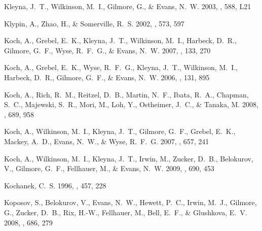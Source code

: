 \documentclass[manuscript]{aastex}
\begin{document}
\begin{thebibliography}{381}
{Kleyna}, J.~T., {Wilkinson}, M.~I., {Gilmore}, G., \& {Evans}, N.~W. 2003,
  \apjl, 588, L21

{Klypin}, A., {Zhao}, H., \& {Somerville}, R.~S. 2002, \apj, 573, 597

{Koch}, A., {Grebel}, E.~K., {Kleyna}, J.~T., {Wilkinson}, M.~I., {Harbeck},
  D.~R., {Gilmore}, G.~F., {Wyse}, R.~F.~G., \& {Evans}, N.~W.
  2007{}, \aj, 133, 270

{Koch}, A., {Grebel}, E.~K., {Wyse}, R.~F.~G., {Kleyna}, J.~T., {Wilkinson},
  M.~I., {Harbeck}, D.~R., {Gilmore}, G.~F., \& {Evans}, N.~W. 2006, \aj, 131,
  895

{Koch}, A., {Rich}, R.~M., {Reitzel}, D.~B., {Martin}, N.~F., {Ibata}, R.~A.,
  {Chapman}, S.~C., {Majewski}, S.~R., {Mori}, M., {Loh}, Y., {Ostheimer},
  J.~C., \& {Tanaka}, M. 2008, \apj, 689, 958

{Koch}, A., {Wilkinson}, M.~I., {Kleyna}, J.~T., {Gilmore}, G.~F., {Grebel},
  E.~K., {Mackey}, A.~D., {Evans}, N.~W., \& {Wyse}, R.~F.~G.
  2007{}, \apj, 657, 241

{Koch}, A., {Wilkinson}, M.~I., {Kleyna}, J.~T., {Irwin}, M., {Zucker}, D.~B.,
  {Belokurov}, V., {Gilmore}, G.~F., {Fellhauer}, M., \& {Evans}, N.~W. 2009,
  \apj, 690, 453

{Kochanek}, C.~S. 1996, \apj, 457, 228

{Koposov}, S., {Belokurov}, V., {Evans}, N.~W., {Hewett}, P.~C., {Irwin},
  M.~J., {Gilmore}, G., {Zucker}, D.~B., {Rix}, H.-W., {Fellhauer}, M., {Bell},
  E.~F., \& {Glushkova}, E.~V. 2008, \apj, 686, 279


\end{thebibliography}
\end{document}
